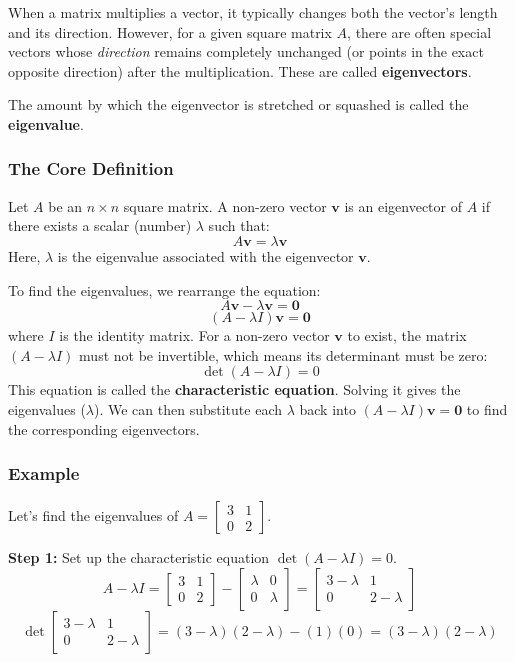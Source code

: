 

When a matrix multiplies a vector, it typically changes both the vector's length and its direction. However, for a given square matrix $A$, there are often special vectors whose \emph{direction} remains completely unchanged (or points in the exact opposite direction) after the multiplication. These are called \textbf{eigenvectors}. 

The amount by which the eigenvector is stretched or squashed is called the \textbf{eigenvalue}.

\subsubsection*{The Core Definition}

Let $A$ be an $n \times n$ square matrix. A non-zero vector $\mathbf{v}$ is an eigenvector of $A$ if there exists a scalar (number) $\lambda$ such that:
\[ A\mathbf{v} = \lambda\mathbf{v} \]
Here, $\lambda$ is the eigenvalue associated with the eigenvector $\mathbf{v}$.

To find the eigenvalues, we rearrange the equation:
\[ A\mathbf{v} - \lambda\mathbf{v} = \mathbf{0} \]
\[ (A - \lambda I)\mathbf{v} = \mathbf{0} \]
where $I$ is the identity matrix. For a non-zero vector $\mathbf{v}$ to exist, the matrix $(A - \lambda I)$ must not be invertible, which means its determinant must be zero:
\[ \det(A - \lambda I) = 0 \]
This equation is called the \textbf{characteristic equation}. Solving it gives the eigenvalues ($\lambda$). We can then substitute each $\lambda$ back into $(A - \lambda I)\mathbf{v} = \mathbf{0}$ to find the corresponding eigenvectors.

\subsubsection*{Example}

Let's find the eigenvalues of $A = \begin{bmatrix} 3 & 1 \\ 0 & 2 \end{bmatrix}$.

\textbf{Step 1:} Set up the characteristic equation $\det(A - \lambda I) = 0$.
\[ A - \lambda I = \begin{bmatrix} 3 & 1 \\ 0 & 2 \end{bmatrix} - \begin{bmatrix} \lambda & 0 \\ 0 & \lambda \end{bmatrix} = \begin{bmatrix} 3 - \lambda & 1 \\ 0 & 2 - \lambda \end{bmatrix} \]
\[ \det \begin{bmatrix} 3 - \lambda & 1 \\ 0 & 2 - \lambda \end{bmatrix} = (3 - \lambda)(2 - \lambda) - (1)(0) = (3 - \lambda)(2 - \lambda) \]

